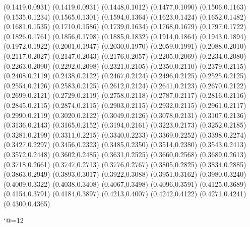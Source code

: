 \PST@Solid(0.1419,0.0931)
(0.1419,0.0931)
(0.1448,0.1012)
(0.1477,0.1090)
(0.1506,0.1163)
(0.1535,0.1234)
(0.1565,0.1301)
(0.1594,0.1364)
(0.1623,0.1424)
(0.1652,0.1482)
(0.1681,0.1535)
(0.1710,0.1586)
(0.1739,0.1634)
(0.1768,0.1679)
(0.1797,0.1722)
(0.1826,0.1761)
(0.1856,0.1798)
(0.1885,0.1832)
(0.1914,0.1864)
(0.1943,0.1894)
(0.1972,0.1922)
(0.2001,0.1947)
(0.2030,0.1970)
(0.2059,0.1991)
(0.2088,0.2010)
(0.2117,0.2027)
(0.2147,0.2043)
(0.2176,0.2057)
(0.2205,0.2069)
(0.2234,0.2080)
(0.2263,0.2090)
(0.2292,0.2098)
(0.2321,0.2105)
(0.2350,0.2110)
(0.2379,0.2115)
(0.2408,0.2119)
(0.2438,0.2122)
(0.2467,0.2124)
(0.2496,0.2125)
(0.2525,0.2125)
(0.2554,0.2126)
(0.2583,0.2125)
(0.2612,0.2124)
(0.2641,0.2123)
(0.2670,0.2122)
(0.2699,0.2121)
(0.2729,0.2119)
(0.2758,0.2118)
(0.2787,0.2117)
(0.2816,0.2116)
(0.2845,0.2115)
(0.2874,0.2115)
(0.2903,0.2115)
(0.2932,0.2115)
(0.2961,0.2117)
(0.2990,0.2119)
(0.3020,0.2122)
(0.3049,0.2126)
(0.3078,0.2131)
(0.3107,0.2136)
(0.3136,0.2143)
(0.3165,0.2152)
(0.3194,0.2161)
(0.3223,0.2173)
(0.3252,0.2185)
(0.3281,0.2199)
(0.3311,0.2215)
(0.3340,0.2233)
(0.3369,0.2252)
(0.3398,0.2274)
(0.3427,0.2297)
(0.3456,0.2323)
(0.3485,0.2350)
(0.3514,0.2380)
(0.3543,0.2413)
(0.3572,0.2448)
(0.3602,0.2485)
(0.3631,0.2525)
(0.3660,0.2568)
(0.3689,0.2613)
(0.3718,0.2661)
(0.3747,0.2713)
(0.3776,0.2767)
(0.3805,0.2825)
(0.3834,0.2885)
(0.3863,0.2949)
(0.3893,0.3017)
(0.3922,0.3088)
(0.3951,0.3162)
(0.3980,0.3240)
(0.4009,0.3322)
(0.4038,0.3408)
(0.4067,0.3498)
(0.4096,0.3591)
(0.4125,0.3689)
(0.4154,0.3791)
(0.4184,0.3897)
(0.4213,0.4007)
(0.4242,0.4122)
(0.4271,0.4241)
(0.4300,0.4365)

\catcode`@=12
\fi
\endpspicture
